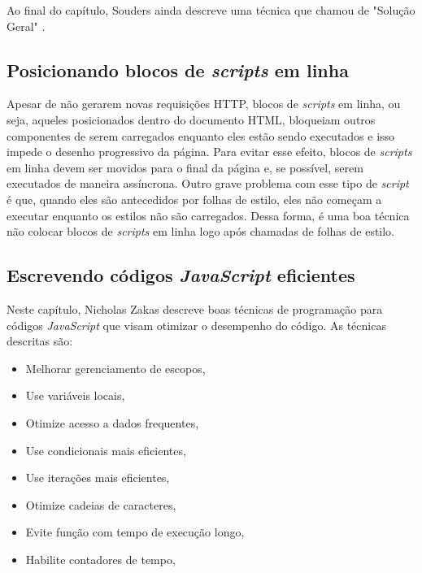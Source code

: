 Ao final do capítulo, Souders ainda descreve uma técnica que chamou de "Solução Geral" \cite[p.~59]{EvenFaster}.

\subsection{Posicionando blocos de \textit{scripts} em linha}
\label{subsec:evenfaster_cap6}
Apesar de não gerarem novas requisições HTTP, blocos de \textit{scripts} em linha, ou seja, aqueles posicionados dentro do documento HTML, bloqueiam outros componentes de serem carregados enquanto eles estão sendo executados e isso impede o desenho progressivo da página. Para evitar esse efeito, blocos de \textit{scripts} em linha devem ser movidos para o final da página e, se possível, serem executados de maneira assíncrona. Outro grave problema com esse tipo de \textit{script} é que, quando eles são antecedidos por folhas de estilo, eles não começam a executar enquanto os estilos não são carregados. Dessa forma, é uma boa técnica não colocar blocos de \textit{scripts} em linha logo após chamadas de folhas de estilo.

\subsection{Escrevendo códigos \textit{JavaScript} eficientes}
\label{subsec:evenfaster_cap7}
Neste capítulo, Nicholas Zakas descreve boas técnicas de programação para códigos \textit{JavaScript} que visam otimizar o desempenho do código. As técnicas descritas são:

\begin{itemize}
	\item Melhorar gerenciamento de escopos, \cite[p.79]{EvenFaster}
	\item Use variáveis locais, \cite[p.~81]{EvenFaster}
	\item Otimize acesso a dados frequentes, \cite[p.~85]{EvenFaster}
	\item Use condicionais mais eficientes, \cite[p.~89]{EvenFaster}
	\item Use iterações mais eficientes, \cite[p.~93]{EvenFaster}
	\item Otimize cadeias de caracteres, \cite[p.~99]{EvenFaster}
	\item Evite função com tempo de execução longo, \cite[p.~102]{EvenFaster}
	\item Habilite contadores de tempo, \cite[p.~103]{EvenFaster}
\end{itemize}

